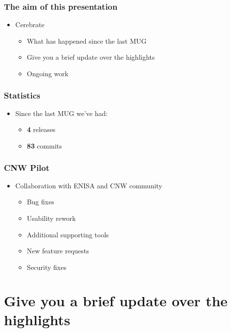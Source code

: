 
\begin{frame}[t,plain]
\titlepage
\end{frame}

\begin{frame}
  \frametitle{The aim of this presentation}
  \begin{itemize}
    \item Cerebrate
    \begin{itemize}
     \item What has happened since the last MUG
     \item Give you a brief update over the highlights
     \item Ongoing work
    \end{itemize}
  \end{itemize}
\end{frame}

\begin{frame}
  \frametitle{Statistics}
  \begin{itemize}
    \item Since the last MUG we've had:
    \begin{itemize}
        \item {\bf 4} releases
        \item {\bf 83} commits
    \end{itemize}
  \end{itemize}
\end{frame}

\begin{frame}
  \frametitle{CNW Pilot}
  \begin{itemize}
    \item Collaboration with ENISA and CNW community
    \begin{itemize}
        \item Bug fixes
        \item Usability rework
        \item Additional supporting tools
        \item New feature requests
        \item Security fixes
    \end{itemize}
  \end{itemize}
\end{frame}

\section{Give you a brief update over the highlights}


